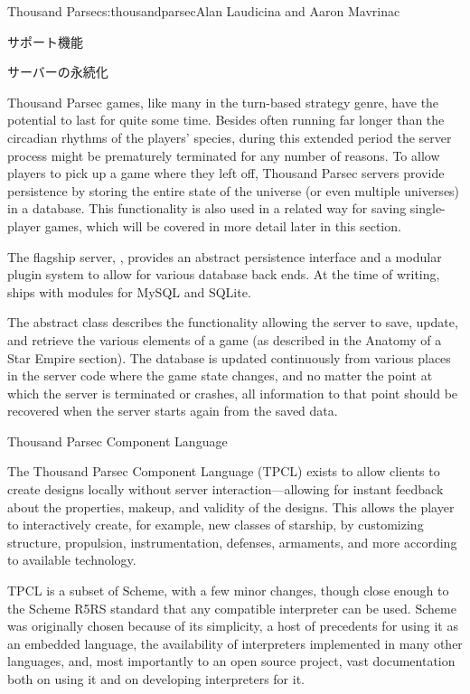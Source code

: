 \begin{aosachapter}{Thousand Parsec}{s:thousandparsec}{Alan Laudicina and Aaron Mavrinac}
\begin{aosasect1}{サポート機能}
\begin{aosasect2}{サーバーの永続化}

Thousand Parsec games, like many in the turn-based strategy genre,
have the potential to last for quite some time. Besides often running
far longer than the circadian rhythms of the players' species, during
this extended period the server process might be prematurely
terminated for any number of reasons. To allow players to pick up a
game where they left off, Thousand Parsec servers provide persistence
by storing the entire state of the universe (or even multiple
universes) in a database. This functionality is also used in a related
way for saving single-player games, which will be covered in more
detail later in this section.

The flagship server, , provides an abstract
persistence interface and a modular plugin system to allow for various
database back ends. At the time of writing,  ships
with modules for MySQL and SQLite.

The abstract  class describes the functionality
allowing the server to save, update, and retrieve the various elements
of a game (as described in the Anatomy of a Star Empire section). The
database is updated continuously from various places in the server
code where the game state changes, and no matter the point at which
the server is terminated or crashes, all information to that point
should be recovered when the server starts again from the saved data.

\end{aosasect2}

\begin{aosasect2}{Thousand Parsec Component Language}

The Thousand Parsec Component Language (TPCL) exists to allow clients
to create designs locally without server interaction---allowing for
instant feedback about the properties, makeup, and validity of the
designs. This allows the player to interactively create, for example,
new classes of starship, by customizing structure, propulsion,
instrumentation, defenses, armaments, and more according to available
technology.

TPCL is a subset of Scheme, with a few minor changes, though close
enough to the Scheme R5RS standard that any compatible interpreter can
be used. Scheme was originally chosen because of its simplicity, a
host of precedents for using it as an embedded language, the
availability of interpreters implemented in many other languages, and,
most importantly to an open source project, vast documentation both on
using it and on developing interpreters for it.


\end{aosasect2}
\end{aosasect1}
\end{aosachapter}
